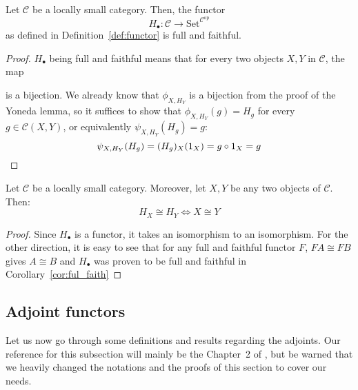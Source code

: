 \begin{corollary}[4.3.7]\label{cor:ful_faith} Let $\mathcal{C}$ be a locally small category. Then, the functor
\[H_{\bullet}:\mathcal{C}\to\mathrm{Set}^{\mathcal{C}^{\mathrm{op}}}\]
as defined in Definition~\ref{def:functor} is full and faithful.
\end{corollary}
\begin{proof} $H_{\bullet}$ being full and faithful means that for every two objects $X,Y$ in $\mathcal{C}$, the map
\begin{center}
\end{center}
is a bijection. We already know that $\phi_{X,H_Y}$ is a bijection from the proof of the Yoneda lemma, so it suffices to show that $\phi_{X,H_Y}(g)=H_g$ for every $g\in\mathcal{C}(X,Y)$, or equivalently $\psi_{X,H_Y}(H_g)=g$:
\[\psi_{X,H_Y}(H_g)=(H_g)_X(1_X)=g\circ 1_X=g\qedhere\]
\end{proof}
\begin{proposition}[4.3.10]\label{prop:unique} Let $\mathcal{C}$ be a locally small category. Moreover, let $X,Y$ be any two objects of $\mathcal{C}$. Then:
\[H_X\cong H_Y \Longleftrightarrow X\cong Y\]
\end{proposition}
\begin{proof} Since $H_{\bullet}$ is a functor, it takes an isomorphism to an isomorphism. For the other direction, it is easy to see that for any full and faithful functor $F$, $FA\cong FB$ gives $A\cong B$ and $H_{\bullet}$ was proven to be full and faithful in Corollary~\ref{cor:ful_faith}
\end{proof}

\subsection{Adjoint functors}
Let us now go through some definitions and results regarding the adjoints. Our reference for this subsection will mainly be the Chapter~2 of \cite{basic_cat}, but be warned that we heavily changed the notations and the proofs of this section to cover our needs.

